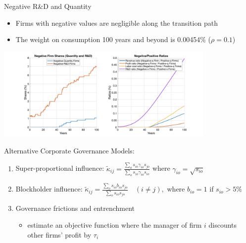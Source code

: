 \documentclass[
  10pt,
  aspectratio=169,   %
]{beamer}
\theoremstyle{plain}
\begin{document}
\begin{frame}{Negative R\&D and Quantity}
  \begin{itemize}
  \item Firms with negative values are negligible along the transition path
  \item The weight on consumption 100 years and beyond is 0.00454\% ($\rho=0.1$)
  \end{itemize}
  \begin{center}
    \includegraphics[width=0.8\textwidth]{figures/transition_path_analysis.png}
  \end{center}
  \hyperlink{hjb}{}
\end{frame}

\begin{frame}{Alternative Corporate Governance Models: \\ \citet{Ederer2024-rw}}
  \begin{enumerate}
    \item Super-proportional influence: $\tilde{\kappa}_{ij}=\frac{\sum_{o}s_{io}\gamma_{io}s_{jo}}{\sum_{o}s_{io}\gamma_{io}s_{io}}$ where $\gamma_{io}=\sqrt{s_{io}}$
          \medskip{}
    \item Blockholder influence: $\tilde{\kappa}_{ij}=\frac{\sum_{o}s_{io}b_{io}s_{jo}}{\sum_{o}s_{io}s_{jo}}\quad(i\neq j),$ where $b_{io}=1$ if $s_{io}>5\%$
          \medskip{}
    \item Governance frictions and entrenchment
          \begin{itemize}
            \item \citet{Azar2021-mb} estimate an objective function where the manager of firm $i$ discounts other firms' profit by $\tau_{i}$
          \end{itemize}
  \end{enumerate}
\end{frame}
\end{document}

